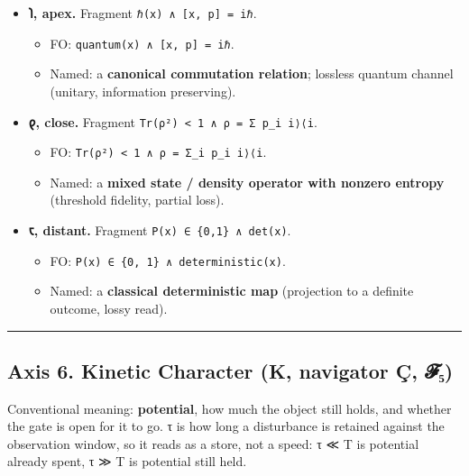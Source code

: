 \documentclass[12pt,a4paper]{article}
\begin{document}
\begin{itemize}
\tightlist
\item
  \textbf{𐑐, apex.} Fragment \texttt{ℏ(x)\ ∧\ {[}x,\ p{]}\ =\ iℏ}.

  \begin{itemize}
  \tightlist
  \item
    FO: \texttt{quantum(x)\ ∧\ {[}x,\ p{]}\ =\ iℏ}.
  \item
    Named: a \textbf{canonical commutation relation}; lossless quantum
    channel (unitary, information preserving).
  \end{itemize}
\item
  \textbf{𐑞, close.} Fragment
  \texttt{Tr(ρ²)\ \textless{}\ 1\ ∧\ ρ\ =\ Σ\ p\_i\ \textbar{}i⟩⟨i\textbar{}}.

  \begin{itemize}
  \tightlist
  \item
    FO:
    \texttt{Tr(ρ²)\ \textless{}\ 1\ ∧\ ρ\ =\ Σ\_i\ p\_i\ \textbar{}i⟩⟨i\textbar{}}.
  \item
    Named: a \textbf{mixed state / density operator with nonzero
    entropy} (threshold fidelity, partial loss).
  \end{itemize}
\item
  \textbf{𐑱, distant.} Fragment \texttt{P(x)\ ∈\ \{0,1\}\ ∧\ det(x)}.

  \begin{itemize}
  \tightlist
  \item
    FO: \texttt{P(x)\ ∈\ \{0,\ 1\}\ ∧\ deterministic(x)}.
  \item
    Named: a \textbf{classical deterministic map} (projection to a
    definite outcome, lossy read).
  \end{itemize}
\end{itemize}

\begin{center}\rule{0.5\linewidth}{0.5pt}\end{center}

\hypertarget{axis-6.-kinetic-character-k-navigator-uxe7-ux1d4d5ux2085}{%
\subsection{Axis 6. Kinetic Character (K, navigator Ç,
𝓕₅)}\label{axis-6.-kinetic-character-k-navigator-uxe7-ux1d4d5ux2085}}

Conventional meaning: \textbf{potential}, how much the object still
holds, and whether the gate is open for it to go. τ is how long a
disturbance is retained against the observation window, so it reads as a
store, not a speed: τ ≪ T is potential already spent, τ ≫ T is potential
still held.
\end{document}
